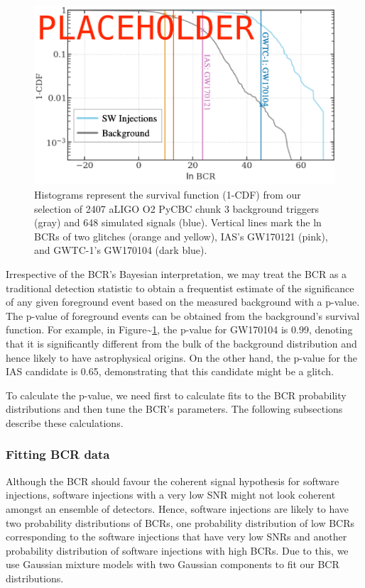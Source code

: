 \documentclass[%
 reprint,
 amsmath,amssymb,
 aps,
]{revtex4}
\begin{document}
\begin{figure}[!h]

{\centering \includegraphics[width=0.75\linewidth]{images/bcr_cdf} 

}

\caption[BCR distribution example]{Histograms represent the survival function (1-CDF) from our selection of 2407 aLIGO O2 PyCBC chunk 3 background triggers (gray) and 648 simulated signals (blue). Vertical lines mark the ln BCRs of two glitches (orange and yellow), IAS's GW170121 (pink), and GWTC-1's GW170104 (dark blue).}\label{fig:bcrCdf}
\end{figure}

Irrespective of the BCR's Bayesian interpretation, we may treat the BCR as a traditional detection statistic to obtain a
frequentist estimate of the significance of any given foreground event based on the measured background with a p-value.
The p-value of foreground events can be obtained from the background's survival function. For example, in
Figure\textasciitilde\ref{fig:bcrCdf}, the p-value for GW170104 is 0.99, denoting that it is significantly different from the bulk
of the background distribution and hence likely to have astrophysical origins. On the other hand, the p-value for the
IAS candidate is 0.65, demonstrating that this candidate might be a glitch.

To calculate the p-value, we need first to calculate fits to the BCR probability
distributions and then tune the BCR's parameters. The following subsections describe these calculations.

\hypertarget{fitting-bcr-data}{%
\subsubsection{Fitting BCR data}\label{fitting-bcr-data}}

Although the BCR should favour the coherent signal hypothesis for software injections,
software injections with a very low SNR might not look coherent amongst an ensemble of
detectors. Hence, software injections are likely to have two probability distributions
of BCRs, one probability distribution of low BCRs corresponding to the software
injections that have very low SNRs and another probability distribution of software
injections with high BCRs. Due to this, we use Gaussian mixture models with two Gaussian
components to fit our BCR distributions.
\end{document}
